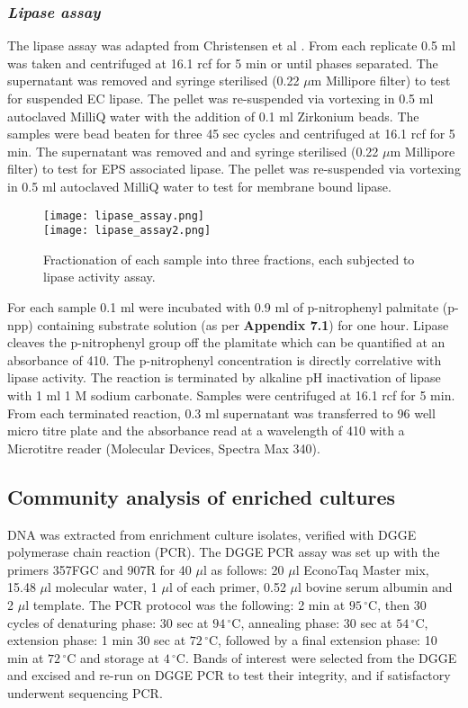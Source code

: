 \documentclass[twoside]{article}
\begin{document}
\subsubsection{\emph{Lipase assay}}
The lipase assay was adapted from Christensen et al \cite{christensen_03}. From each replicate 0.5 ml was taken and centrifuged at 16.1 rcf for 5 min or until phases separated. The supernatant was removed and syringe sterilised (0.22 $\mu$m Millipore filter) to test for suspended EC lipase.
The pellet was re-suspended via vortexing in 0.5 ml autoclaved MilliQ water with the addition of 0.1 ml Zirkonium beads. The samples were bead beaten for three 45 sec cycles and centrifuged at 16.1 rcf for 5 min. The supernatant was removed and and syringe sterilised (0.22 $\mu$m Millipore filter) to test for EPS associated lipase.
The pellet was re-suspended via vortexing in 0.5 ml autoclaved MilliQ water to test for membrane bound lipase.\\


\begin{figure}
\begin{center}
\texttt{[image: lipase\_assay.png]}\\
\texttt{[image: lipase\_assay2.png]}
\caption{Fractionation of each sample into three fractions, each subjected to lipase activity assay.}
\end{center}
\end{figure}

For each sample 0.1 ml were incubated with 0.9 ml of  p-nitrophenyl palmitate (p-npp) containing substrate solution (as per \textbf{Appendix 7.1}) for one hour. Lipase cleaves the p-nitrophenyl group off the plamitate which can be quantified at an absorbance of 410. The p-nitrophenyl concentration is directly correlative with lipase activity. The reaction is terminated by alkaline pH inactivation of lipase with 1 ml 1 M sodium carbonate. Samples were centrifuged at 16.1 rcf for 5 min. From each terminated reaction, 0.3 ml supernatant was transferred to 96 well micro titre plate and the absorbance read at a wavelength of 410 with a Microtitre reader (Molecular Devices, Spectra Max 340).
\FloatBarrier
\subsection{Community analysis of enriched cultures}
DNA was extracted from enrichment culture isolates, verified with DGGE polymerase chain reaction (PCR). The DGGE PCR assay was set up with the primers 357FGC and 907R for 40 $\mu$l as follows: 20 $\mu$l EconoTaq Master mix, 15.48 $\mu$l molecular water, 1 $\mu$l of each primer, 0.52 $\mu$l bovine serum albumin and 2 $\mu$l template. The PCR protocol was the following: 2 min at $95\,^{\circ}\mathrm{C}$, then 30 cycles of denaturing phase: 30 sec at $94\,^{\circ}\mathrm{C}$, annealing phase: 30 sec at  $54\,^{\circ}\mathrm{C}$, extension phase: 1 min 30 sec at $72\,^{\circ}\mathrm{C}$, followed by a final extension phase: 10 min at $72\,^{\circ}\mathrm{C}$ and storage at $4\,^{\circ}\mathrm{C}$.
Bands of interest were selected from the DGGE and excised and re-run on DGGE PCR to test their integrity, and if satisfactory underwent sequencing PCR. 
\end{document}
